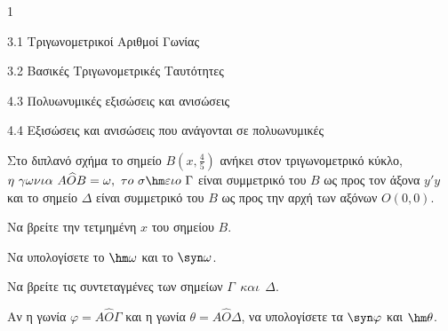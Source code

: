 \begin{center}
\end{center}
\begin{ylh}{1}
\item 3.1 Τριγωνομετρικοί Αριθμοί Γωνίας
\item 3.2 Βασικές Τριγωνομετρικές Ταυτότητες
\item 4.3 Πολυωνυμικές εξισώσεις και ανισώσεις
\item 4.4 Εξισώσεις και ανισώσεις που ανάγονται σε πολυωνυμικές
\end{ylh}
Στο διπλανό σχήμα το σημείο $B\left(x, \frac{4}{5}\right)$ ανήκει στον τριγωνομετρικό κύκλο, $\eta\ \gamma\omega\nu\iota\alpha\ A\widehat{O}B = \omega,\ \tau o\ \sigma\hm \varepsilon\iota o\ \Gamma$ είναι συμμετρικό του $B$ ως προς τον άξονα $y'y$ και το σημείο $\Delta$ είναι συμμετρικό του $B$ ως προς την αρχή των αξόνων $Ο(0,0)$.
\begin{alist}
\item Να βρείτε την τετμημένη $x$ του σημείου $B$.
\item Να υπολογίσετε το $\hm \omega$ και το $\syn \omega$.
\item Να βρείτε τις συντεταγμένες των σημείων $\Gamma\ \ \kappa\alpha\iota\ \ \Delta$.
\item Αν η γωνία $\varphi = A\widehat{O}\Gamma$ και η γωνία $\theta = A\widehat{O}\Delta$, να υπολογίσετε τα $\syn \varphi$ και $\hm \theta$.
\end{alist}

